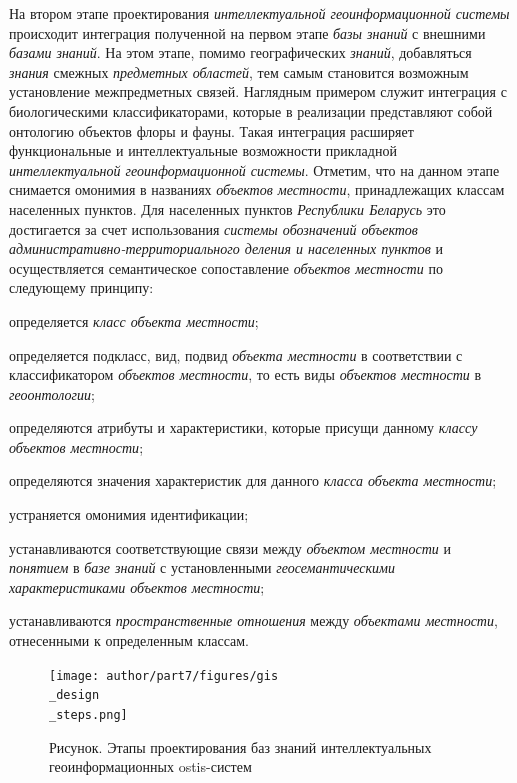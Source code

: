 На втором этапе проектирования \textit{интеллектуальной геоинформационной системы} происходит интеграция полученной на первом этапе \textit{базы знаний} с внешними \textit{базами знаний}. На этом этапе, помимо географических \textit{знаний}, добавляться \textit{знания} смежных \textit{предметных областей}, тем самым становится возможным установление межпредметных связей. Наглядным примером служит интеграция с биологическими классификаторами, которые в реализации представляют собой онтологию объектов флоры и фауны. Такая интеграция расширяет функциональные и интеллектуальные возможности прикладной \textit{интеллектуальной геоинформационной системы}. Отметим, что на данном этапе снимается омонимия в названиях \textit{объектов местности}, принадлежащих классам населенных пунктов. Для населенных пунктов \textit{Республики Беларусь} это достигается за счет использования \textit{системы обозначений объектов административно-территориального деления и населенных пунктов} и осуществляется семантическое сопоставление \textit{объектов местности} по следующему принципу:
\begin{textitemize}
	\item определяется \textit{класс объекта местности\scnsupergroupsign};
	\item определяется подкласс, вид, подвид \textit{объекта местности} в соответствии с классификатором \textit{объектов местности}, то есть виды \textit{объектов местности} в \textit{геоонтологии};
	\item определяются атрибуты и характеристики, которые присущи данному \textit{классу объектов местности\scnsupergroupsign};
	\item определяются значения характеристик для данного \textit{класса объекта местности\scnsupergroupsign};
	\item устраняется омонимия идентификации;
	\item устанавливаются соответствующие связи между \textit{объектом местности} и \textit{понятием} в \textit{базе знаний} с установленными \textit{геосемантическими характеристиками объектов местности};
	\item устанавливаются \textit{пространственные отношения} между \textit{объектами местности}, отнесенными к определенным классам.
\end{textitemize}

\begin{figure}[H]
	\center
	\caption{Рисунок. Этапы проектирования баз знаний интеллектуальных геоинформационных ostis-систем}
	\texttt{[image: author/part7/figures/gis\\\_design\\\_steps.png]}
	\label{fig:gis_design_steps}
\end{figure}

